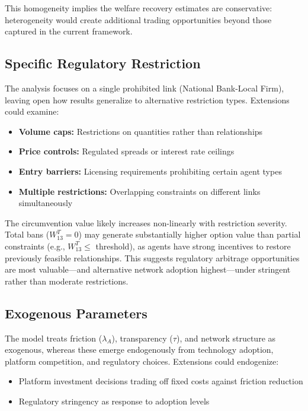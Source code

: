 This homogeneity implies the welfare recovery estimates are conservative: heterogeneity would create additional trading opportunities beyond those captured in the current framework.

\subsection{Specific Regulatory Restriction}

The analysis focuses on a single prohibited link (National Bank-Local Firm), leaving open how results generalize to alternative restriction types. Extensions could examine:

\begin{itemize}
    \item \textbf{Volume caps:} Restrictions on quantities rather than relationships
    \item \textbf{Price controls:} Regulated spreads or interest rate ceilings  
    \item \textbf{Entry barriers:} Licensing requirements prohibiting certain agent types
    \item \textbf{Multiple restrictions:} Overlapping constraints on different links simultaneously
\end{itemize}

The circumvention value likely increases non-linearly with restriction severity. Total bans ($W_{13}^T = 0$) may generate substantially higher option value than partial constraints (e.g., $W_{13}^T \leq$ threshold), as agents have strong incentives to restore previously feasible relationships. This suggests regulatory arbitrage opportunities are most valuable—and alternative network adoption highest—under stringent rather than moderate restrictions.

\subsection{Exogenous Parameters}

The model treats friction ($\lambda_A$), transparency ($\tau$), and network structure as exogenous, whereas these emerge endogenously from technology adoption, platform competition, and regulatory choices. Extensions could endogenize:

\begin{itemize}
    \item Platform investment decisions trading off fixed costs against friction reduction
    \item Regulatory stringency as response to adoption levels
\end{itemize}

